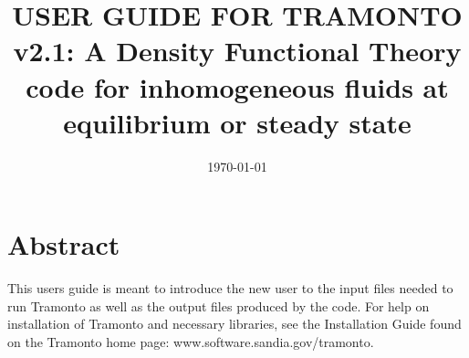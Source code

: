 \documentclass[10pt,onecolumn]{article}
\begin{document}

\title{
   USER GUIDE FOR TRAMONTO v2.1: A Density Functional Theory code for
   inhomogeneous fluids at equilibrium or steady state}

\date{\today}
\maketitle
%

\tableofcontents

\vfill
\break

\section{Abstract}
 This users guide is meant to introduce the new user to the input files
 needed to run Tramonto as well as the output files produced by the code.
 For help on installation of Tramonto and
 necessary libraries, see the Installation Guide found on the Tramonto home
 page: www.software.sandia.gov/tramonto.
 
\end{document}

